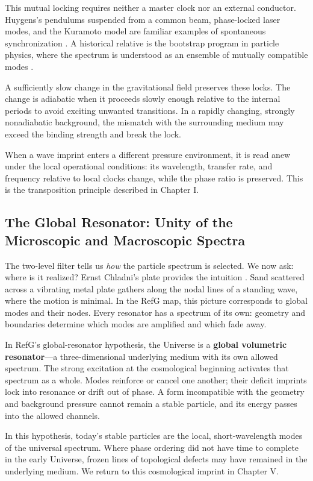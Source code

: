 \documentclass[11pt,a4paper]{article}
\begin{document}
This mutual locking requires neither a master clock nor an external conductor. Huygens's pendulums suspended from a common beam, phase-locked laser modes, and the Kuramoto model are familiar examples of spontaneous synchronization \citep{huygens1665,kuramoto1975}. A historical relative is the bootstrap program in particle physics, where the spectrum is understood as an ensemble of mutually compatible modes \citep{chew1961}.

A sufficiently slow change in the gravitational field preserves these locks. The change is adiabatic when it proceeds slowly enough relative to the internal periods to avoid exciting unwanted transitions. In a rapidly changing, strongly nonadiabatic background, the mismatch with the surrounding medium may exceed the binding strength and break the lock.

When a wave imprint enters a different pressure environment, it is read anew under the local operational conditions: its wavelength, transfer rate, and frequency relative to local clocks change, while the phase ratio is preserved. This is the transposition principle described in Chapter I.

\subsection{The Global Resonator: Unity of the Microscopic and Macroscopic Spectra}

The two-level filter tells us \emph{how} the particle spectrum is selected. We now ask: where is it realized? Ernst Chladni's plate provides the intuition \citep{chladni1787}. Sand scattered across a vibrating metal plate gathers along the nodal lines of a standing wave, where the motion is minimal. In the RefG map, this picture corresponds to global modes and their nodes. Every resonator has a spectrum of its own: geometry and boundaries determine which modes are amplified and which fade away.

In RefG's global-resonator hypothesis, the Universe is a \textbf{global volumetric resonator}---a three-dimensional underlying medium with its own allowed spectrum. The strong excitation at the cosmological beginning activates that spectrum as a whole. Modes reinforce or cancel one another; their deficit imprints lock into resonance or drift out of phase. A form incompatible with the geometry and background pressure cannot remain a stable particle, and its energy passes into the allowed channels.

In this hypothesis, today's stable particles are the local, short-wavelength modes of the universal spectrum. Where phase ordering did not have time to complete in the early Universe, frozen lines of topological defects may have remained in the underlying medium. We return to this cosmological imprint in Chapter V.
\end{document}
